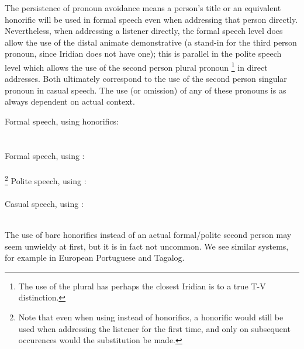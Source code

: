 The persistence of pronoun avoidance means a person's title or an equivalent
honorific will be used in formal speech even when addressing that person
directly. Nevertheless, when addressing a listener directly, the formal speech
level does allow the use of the distal animate demonstrative  (a
stand-in for the third person pronoun, since Iridian does not have one); this is
parallel in the polite speech level which allows the use of the second person
plural pronoun \footnote{The use of the plural  has perhaps
the closest Iridian is to a true T-V distinction.} in direct addresses. Both
ultimately correspond to the use of the second person singular pronoun 
in casual speech. The use (or omission) of any of these pronouns is as always
dependent on actual context.

\pex
	\a Formal speech, using honorifics:\\
	\\
	\medskip\\
	Formal speech, using :\\
	\\
	\footnote{Note that even when using  instead of honorifics, a honorific would still be used when addressing the listener for the first time, and only on subsequent occurences would the substitution be made.}
	\a Polite speech, using :\\
	\\
	\a Casual speech, using :\\
	\\
\xe

The use of bare honorifics instead of an actual formal/polite second person may seem unwieldy at first, but it is in fact not uncommon. We see similar systems, for example in European Portuguese and Tagalog.

